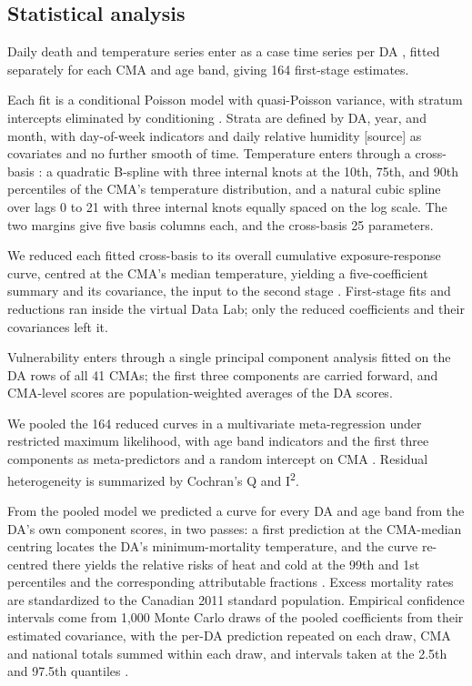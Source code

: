 \documentclass[12pt]{article}
\begin{document}
\subsection{Statistical analysis}

Daily death and temperature series enter as a case time series
per DA \citep{gasparrini2021, gasparrini2022cts}, fitted
separately for each CMA and age band, giving 164 first-stage
estimates.

Each fit is a conditional Poisson model with quasi-Poisson
variance, with stratum intercepts eliminated by conditioning
\citep{armstrong2014}. Strata are defined by DA, year, and
month, with day-of-week indicators and daily relative humidity
[source] as covariates and no further smooth of time. Temperature enters through a cross-basis
\citep{gasparrini2014dlnm}: a quadratic B-spline with three
internal knots at the 10th, 75th, and 90th percentiles of the
CMA's temperature distribution, and a natural cubic spline over
lags 0 to 21 with three internal knots equally spaced on the log
scale. The two margins give five basis columns each, and the
cross-basis 25 parameters.

We reduced each fitted cross-basis to its overall cumulative
exposure-response curve, centred at the CMA's median
temperature, yielding a five-coefficient summary and its
covariance, the input to the second stage
\citep{gasparrini2013reducing}. First-stage fits and reductions
ran inside the virtual Data Lab; only the reduced coefficients
and their covariances left it.

Vulnerability enters through a single principal component
analysis fitted on the DA rows of all 41 CMAs; the first three
components are carried forward, and CMA-level scores are
population-weighted averages of the DA scores.

We pooled the 164 reduced curves in a multivariate
meta-regression under restricted maximum likelihood, with age
band indicators and the first three components as
meta-predictors and a random intercept on CMA
\citep{sera2019mixmeta, gasparrini2012mvmeta, sera2022extended}.
Residual heterogeneity is summarized by Cochran's Q and
I\textsuperscript{2}.

From the pooled model we predicted a curve for every DA and age
band from the DA's own component scores, in two passes: a first
prediction at the CMA-median centring locates the DA's
minimum-mortality temperature, and the curve re-centred there
yields the relative risks of heat and cold at the 99th and 1st
percentiles and the corresponding attributable fractions
\citep{gasparrini2014attributable}. Excess mortality
rates are standardized to the Canadian 2011 standard population.
Empirical confidence intervals come from 1,000 Monte Carlo draws
of the pooled coefficients from their estimated covariance, with
the per-DA prediction repeated on each draw, CMA and national
totals summed within each draw, and intervals taken at the 2.5th
and 97.5th quantiles \citep{masselot2025extensions}.
\end{document}
